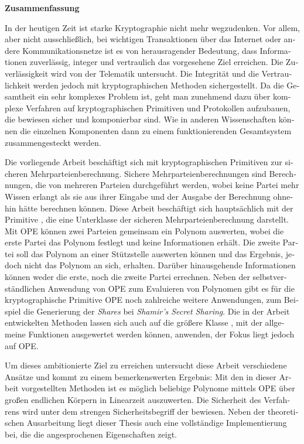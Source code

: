 \cleardoublepage
%
\noindent{}\textsf{\textbf{\huge Zusammenfassung}}
%
\bigskip{}
\begin{otherlanguage}{ngerman}

\noindent{}In der heutigen Zeit ist starke Kryptographie nicht mehr wegzudenken.
Vor allem, aber nicht ausschließlich, bei wichtigen Transaktionen über das
Internet oder andere Kommunikationsnetze ist es von herausragender Bedeutung,
dass Informationen zuverlässig, integer und vertraulich das vorgesehene Ziel
erreichen. Die Zuverlässigkeit wird von der Telematik untersucht. Die Integrität
und die Vertraulichkeit werden jedoch mit kryptographischen Methoden
sichergestellt. Da die Gesamtheit ein sehr komplexes Problem ist, geht man
zunehmend dazu über komplexe Verfahren auf kryptographischen Primitiven und
Protokollen aufzubauen, die bewiesen sicher und komponierbar sind. Wie in
anderen Wissenschaften können die einzelnen Komponenten dann zu einem
funktionierenden Gesamtsystem zusammengesteckt werden.

Die vorliegende Arbeit beschäftigt sich mit kryptographischen Primitiven zur
sicheren Mehrparteienberechnung. Sichere Mehrparteienberechnungen sind
Berechnungen, die von mehreren Parteien durchgeführt werden, wobei keine Partei
mehr Wissen erlangt als sie aus ihrer Eingabe und der Ausgabe der Berechnung
ohnehin hätte berechnen können. Diese Arbeit beschäftigt sich hauptsächlich mit
der Primitive , die eine
Unterklasse der sicheren Mehrparteienberechnung darstellt. Mit OPE können zwei
Parteien gemeinsam ein Polynom auswerten, wobei die erste Partei das Polynom
festlegt und keine Informationen erhält. Die zweite Partei soll das Polynom an
einer Stützstelle auswerten können und das Ergebnis, jedoch nicht das Polynom an
sich, erhalten. Darüber hinausgehende Informationen können weder die erste, noch
die zweite Partei errechnen. Neben der selbstverständlichen Anwendung von OPE
zum Evaluieren von Polynomen gibt es für die kryptographische Primitive OPE noch
zahlreiche weitere Anwendungen, zum Beispiel die Generierung der \emph{Shares}
bei \emph{Shamir's Secret Sharing}. Die in der Arbeit entwickelten Methoden
lassen sich auch auf die größere Klasse , mit der allgemeine Funktionen ausgewertet werden können,
anwenden, der Fokus liegt jedoch auf OPE.

Um dieses ambitionierte Ziel zu erreichen untersucht diese Arbeit verschiedene
Ansätze und kommt zu einem bemerkenswerten Ergebnis: Mit den in dieser Arbeit
vorgestellten Methoden ist es möglich beliebige Polynome mittels OPE über großen
endlichen Körpern in Linearzeit auszuwerten. Die Sicherheit des Verfahrens wird
unter dem strengen Sicherheitsbegriff der 
bewiesen.  Neben der theoretischen Ausarbeitung liegt dieser Thesis auch eine
vollständige Implementierung bei, die die angesprochenen Eigenschaften zeigt.

\end{otherlanguage}
%
\cleardoublepage
%
